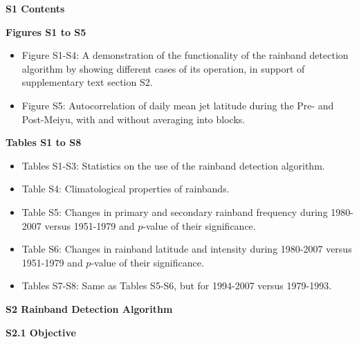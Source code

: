 \documentclass[draft,grl]{agutexSI}
\begin{document}
\begin{article}

%
%


\noindent\textbf{{\Large S1 Contents}}

\vspace{2mm}

\noindent\textbf{Figures S1 to S5}
\begin{itemize}
	\item Figure S1-S4: A demonstration of the functionality of the rainband detection algorithm by showing different cases of its operation, in support of supplementary text section S2.

	\item Figure S5: Autocorrelation of daily mean jet latitude during the Pre- and Post-Meiyu, with and without averaging into blocks.

\end{itemize}

\vspace{3mm}

\noindent\textbf{Tables S1 to S8}
\begin{itemize}
\item Tables S1-S3: Statistics on the use of the rainband detection algorithm.

\item Table S4: Climatological properties of rainbands. 

\item Table S5: Changes in primary and secondary rainband frequency during 1980-2007 versus 1951-1979 and $p$-value of their significance.

\item Table S6: Changes in rainband latitude and intensity during 1980-2007 versus 1951-1979 and $p$-value of their significance.

\item Tables S7-S8: Same as Tables S5-S6, but for 1994-2007 versus 1979-1993.
\end{itemize}

\vspace{5mm}

\noindent\textbf{{\Large S2 Rainband Detection Algorithm}}
\vspace{2mm}

\noindent\textbf{S2.1 Objective}


\end{article}
\end{document}
